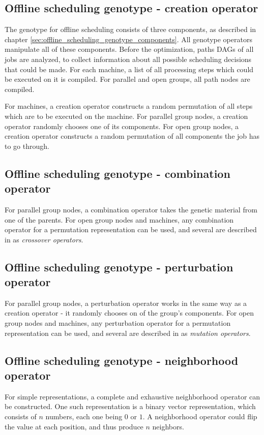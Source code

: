 \subsection{Offline scheduling genotype - creation operator}
The genotype for offline scheduling consists of three components, as described in chapter \ref{sec:offline_scheduling_genotype_components}. All genotype operators manipulate all of these components. Before the optimization, paths DAGs of all jobs are analyzed, to collect information about all possible scheduling decisions that could be made. For each machine, a list of all processing steps which could be executed on it is compiled. For parallel and open groups, all path nodes are compiled.

For machines, a creation operator constructs a random permutation of all steps which are to be executed on the machine. For parallel group nodes, a creation operator randomly chooses one of its components. For open group nodes, a creation operator constructs a random permutation of all components the job has to go through.

\subsection{Offline scheduling genotype - combination operator}
For parallel group nodes, a combination operator takes the genetic material from one of the parents. For open group nodes and machines, any combination operator for a permutation representation can be used, and several are described in \citep{cicirello2023ecta} as \textit{crossover operators}.

\subsection{Offline scheduling genotype - perturbation operator}
For parallel group nodes, a perturbation operator works in the same way as a creation operator - it randomly chooses on of the group's components. For open group nodes and machines, any perturbation operator for a permutation representation can be used, and several are described in \citep{cicirello2023ecta} as \textit{mutation operators}.

\subsection{Offline scheduling genotype - neighborhood operator}
For simple representations, a complete and exhaustive neighborhood operator can be constructed. One such representation is a binary vector representation, which consists of $n$ numbers, each one being $0$ or $1$. A neighborhood operator could flip the value at each position, and thus produce $n$ neighbors.


